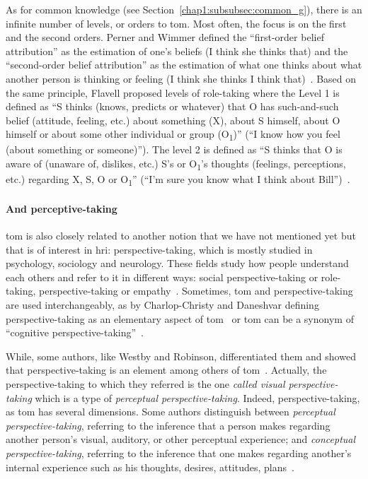 \documentclass[a4paper,11pt,twoside]{StyleThese}
\begin{document}
As for common knowledge (see Section~\ref{chap1:subsubsec:common_g}), there is an infinite number of levels, or orders to \acrshort{tom}. Most often, the focus is on the first and the second orders. Perner and Wimmer defined the ``first-order belief attribution'' as the estimation of one's beliefs (\eg I think she thinks that) and the ``second-order belief attribution'' as the estimation of what one  thinks about what another person is thinking or feeling (\eg I think she thinks I think that)~\cite{perner_1985_john}. Based on the same principle, Flavell \etal{} proposed levels of role-taking where the Level 1 is defined as ``S thinks (knows, predicts or whatever) that O has such-and-such belief (attitude, feeling, etc.) about something (X), about S himself, about O himself or about some other individual or group (O\textsubscript{1})'' (\eg ``I know how you feel (about something or someone)''). The level 2 is defined as ``S thinks that O is aware of (unaware of, dislikes, etc.) S's or O\textsubscript{1}'s thoughts (feelings, perceptions, etc.) regarding X, S, O or O\textsubscript{1}'' (\eg ``I'm sure you know what I think about Bill'')~\cite[pp.~49--51]{flavell_1968_development}.

\paragraph{And perceptive-taking} \acrshort{tom} is also closely related to another notion that we have not mentioned yet but that is of interest in \acrshort{hri}: perspective-taking, which is mostly studied in psychology, sociology and neurology. These fields study how people understand each others and refer to it in different ways: social perspective-taking or role-taking, perspective-taking or empathy~\cite{davis_2017_self,quesque_2020_theory}. Sometimes, \acrshort{tom} and perspective-taking are used interchangeably, as by Charlop-Christy and Daneshvar defining perspective-taking as an elementary aspect of \acrshort{tom}~\cite{charlop_2003_using} or \acrshort{tom} can be a synonym of ``cognitive perspective-taking''~\cite{barnes_2004_perspective}. 

While, some authors, like Westby and Robinson, differentiated them and showed that perspective-taking is an element among others of \acrshort{tom}~\cite{westby_2014_developmental}. Actually, the perspective-taking to which they referred is the one \emph{called visual perspective-taking} which is a type of \emph{perceptual perspective-taking}. Indeed, perspective-taking, as \acrshort{tom} has several dimensions. Some authors distinguish between \emph{perceptual perspective-taking}, referring to the inference that a person makes regarding another person's visual, auditory, or other perceptual experience; and \emph{conceptual perspective-taking}, referring to the inference that one makes regarding another's internal experience such as his thoughts, desires, attitudes, plans~\cite{marvin_1976_early}. 
\end{document}
